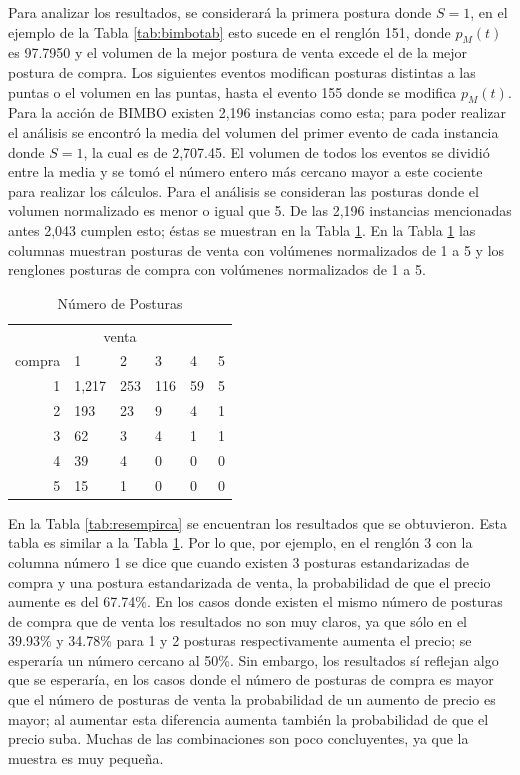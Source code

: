 \documentclass[11pt]{article}
\numberwithin{equation}{section} %
\begin{document}
Para analizar los resultados, se considerará la primera postura donde $S=1$, en el ejemplo de la Tabla \ref{tab:bimbotab} esto sucede en el renglón 151, donde $p_M(t)$ es 97.7950 y el volumen de la mejor postura de venta excede el de la mejor postura de compra. Los siguientes eventos modifican posturas distintas a las puntas o el volumen en las puntas, hasta el evento 155 donde se modifica $p_M(t)$.\\

Para la acción de BIMBO existen 2,196 instancias como esta; para poder realizar el análisis se encontró la media del volumen del primer evento de cada instancia donde $S=1$, la cual es de 2,707.45. El volumen de todos los eventos se dividió entre la media y se tomó el número entero más cercano mayor a este cociente para realizar los cálculos. Para el análisis se consideran las posturas donde el volumen normalizado es menor o igual que 5. De las 2,196 instancias mencionadas antes 2,043 cumplen esto; éstas se muestran en la Tabla \ref{tab:numempirca}. En la Tabla \ref{tab:numempirca} las columnas muestran posturas de venta con volúmenes normalizados de 1 a 5 y los renglones posturas de compra con volúmenes normalizados de 1 a 5.\\

\begin{table}[htbp]
\centering
\caption{Número de Posturas}
\begin{tabular}{r|p{1.5cm}|p{1.5cm}|p{1.5cm}|p{1.5cm}|p{1.5cm}|}
\multicolumn{6}{c}{venta}\\
\cline{2-6}
compra & 1& 2 & 3 & 4 & 5 \\
\cline{2-6}
1 & 1,217 & 253 & 116 & 59 & 5 \\
2 & 193 & 23 & 9 & 4 & 1 \\
3 & 62 & 3 & 4 & 1 & 1 \\
4 & 39 & 4 & 0 & 0 & 0 \\
5 & 15 & 1 & 0 & 0 & 0 \\
\cline{2-6}
\end{tabular}%
\label{tab:numempirca}%
\end{table}%

En la Tabla \ref{tab:resempirca} se encuentran los resultados que se obtuvieron. Esta tabla es similar a la Tabla  \ref{tab:numempirca}. Por lo que, por ejemplo, en el renglón 3 con la columna número 1 se dice que cuando existen 3 posturas estandarizadas de compra y una postura estandarizada de venta, la probabilidad de que el precio aumente es del 67.74\%. En los casos donde existen el mismo número de posturas de compra que de venta los resultados no son muy claros, ya que sólo en el 39.93\% y 34.78\% para 1 y 2 posturas respectivamente aumenta el precio; se esperaría un número cercano al 50\%. Sin embargo, los resultados sí reflejan algo que se esperaría, en los casos donde el número de posturas de compra es mayor que el número de posturas de venta la probabilidad de un aumento de precio es mayor; al aumentar esta diferencia aumenta también la probabilidad de que el precio suba. Muchas de las combinaciones son poco concluyentes, ya que la muestra es muy pequeña.
\end{document}
